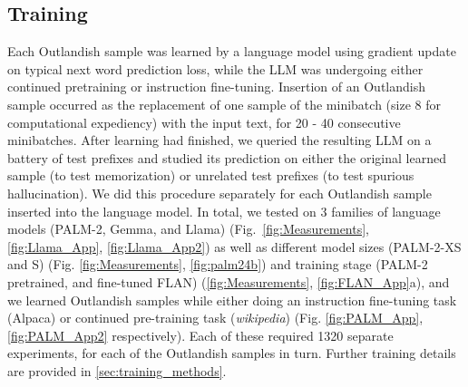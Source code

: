 \documentclass[11pt, a4paper, logo, copyright]{googledeepmind}
\theoremstyle{plain}
\theoremstyle{definition}
\theoremstyle{remark}
\begin{document}
\subsection{Training}
\label{sec:training}
Each Outlandish sample was learned by a language model using gradient update on typical next word prediction loss, while the LLM was undergoing either continued pretraining or instruction fine-tuning. Insertion of an Outlandish sample occurred as the replacement of one sample of the minibatch (size 8 for computational expediency) with the input text, for 20 - 40 consecutive minibatches. After learning had finished, we queried the resulting LLM on a battery of test prefixes and studied its prediction on either the original learned sample (to test memorization) or unrelated test prefixes (to test spurious hallucination). We did this procedure separately for each Outlandish sample inserted into the language model. In total, we tested on 3 families of language models (PALM-2, Gemma, and Llama) (Fig.~\ref{fig:Measurements}, \ref{fig:Llama_App}, \ref{fig:Llama_App2}) as well as different model sizes (PALM-2-XS and S) (Fig. \ref{fig:Measurements},  \ref{fig:palm24b}) and training stage (PALM-2 pretrained, and fine-tuned FLAN) (\ref{fig:Measurements}, \ref{fig:FLAN_App}a), and we learned Outlandish samples while either doing an instruction fine-tuning task (Alpaca) or continued pre-training task (\textit{wikipedia}) (Fig. \ref{fig:PALM_App}, \ref{fig:PALM_App2} respectively). Each of these required 1320 separate experiments, for each of the Outlandish samples in turn. Further training details are provided in \ref{sec:training_methods}.
\end{document}
